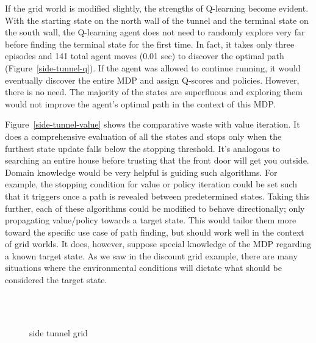 \documentclass{sig-alternate}
\begin{document}
If the grid world is modified slightly, the strengths of Q-learning become evident. With the starting state on the north wall of the tunnel and the terminal state on the south wall, the Q-learning agent does not need to randomly explore very far before finding the terminal state for the first time. In fact, it takes only three episodes and 141 total agent moves (0.01 sec) to discover the optimal path (Figure~\ref{side-tunnel-q}). If the agent was allowed to continue running, it would eventually discover the entire MDP and assign Q-scores and policies. However, there is no need. The majority of the states are superfluous and exploring them would not improve the agent's optimal path in the context of this MDP.

Figure~\ref{side-tunnel-value} shows the comparative waste with value iteration. It does a comprehensive evaluation of all the states and stops only when the furthest state update falls below the stopping threshold. It's analogous to searching an entire house before trusting that the front door will get you outside. Domain knowledge would be very helpful is guiding such algorithms. For example, the stopping condition for value or policy iteration could be set such that it triggers once a path is revealed between predetermined states. Taking this further, each of these algorithms could be modified to behave directionally; only propagating value/policy towards a target state. This would tailor them more toward the specific use case of path finding, but should work well in the context of grid worlds. It does, however, suppose special knowledge of the MDP regarding a known target state. As we saw in the discount grid example, there are many situations where the environmental conditions will dictate what should be considered the target state.


\begin{figure}[!htbp]
    \centering
    \\
    \\
    \caption{side tunnel grid}
\end{figure} 
\end{document}
